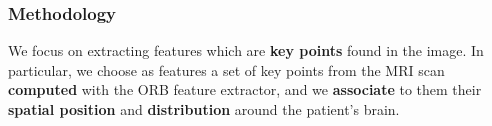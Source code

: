 \begin{frame}
	\frametitle{Methodology}
	
	\Large
	
	\vspace{0.7cm}
	
	We focus on extracting features which are \textbf{key points} found in the image. In particular, we
	choose as features a set of key points from the MRI scan \textbf{computed} with the ORB feature
	extractor, and we \textbf{associate} to them their \textbf{spatial position} and
	\textbf{distribution} around the patient's brain.
	
	\begin{center}
	\end{center}
\end{frame}

